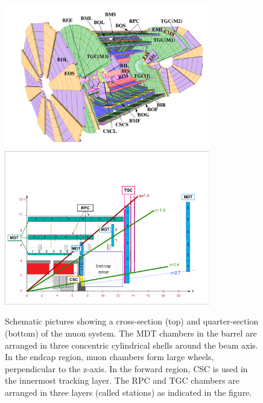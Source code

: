 \begin{figure}
  \begin{center}
    \includegraphics[width=0.80\textwidth]{./figures/TDR_Muon_system_Initial.pdf}
    \includegraphics[width=0.80\textwidth]{./figures/TRIG-2012-03_fig_01.pdf}
    \caption{Schematic pictures \cite{PERF-2007-01} showing a cross-section (top) and quarter-section (bottom) of the muon system. The MDT chambers in the barrel are arranged in three concentric cylindrical shells around the beam axis. In the endcap region, muon chambers form large wheels, perpendicular to the z-axis. In the forward region, CSC is used in the innermost tracking layer. The RPC and TGC chambers are arranged in three layers (called stations) as indicated in the figure.}
    \label{fig:detector-ms}
  \end{center}
\end{figure}


